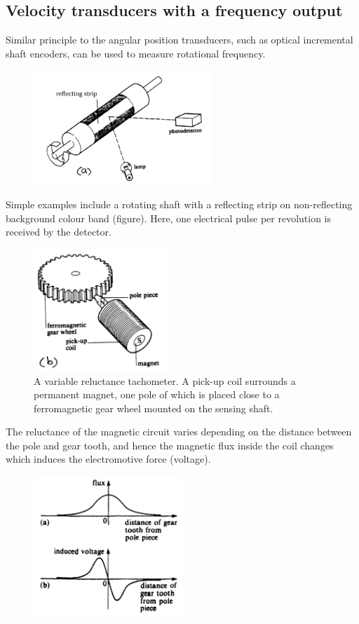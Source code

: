 \documentclass[class=report, crop=false, 12pt,a4paper]{standalone}
\begin{document}
\subsection{Velocity transducers with a frequency output}
Similar principle to the angular position transducers, such as optical incremental shaft encoders, can be used to measure rotational frequency. 
\begin{figure}[H]
  \centering
  \includegraphics[width = 0.6\textwidth]{../img/Mdiagram43.png}
\end{figure}
Simple examples include a rotating shaft with a reflecting strip on non-reflecting background colour band (figure). Here, one electrical pulse per revolution is received by the detector.
\begin{figure}[H]
  \centering
  \includegraphics[width = 0.45\textwidth]{../img/Mdiagram44.png}
  \caption{A variable reluctance tachometer. A pick-up coil surrounds a permanent magnet, one pole of which is placed close to a ferromagnetic gear wheel mounted on the sensing shaft.}
\end{figure}
The reluctance of the magnetic circuit varies depending on the distance between the pole and gear tooth, and hence the magnetic flux inside the coil changes which induces the electromotive force (voltage).
\begin{figure}[H]
  \centering
  \includegraphics[width = 0.5\textwidth]{../img/Mdiagram45.png}
\end{figure}
\end{document}
